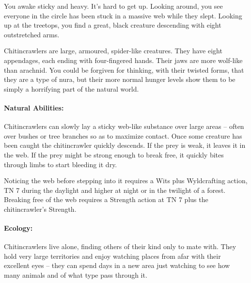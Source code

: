 \begin{multicols}{2}
\begin{itemize}
\end{itemize}


\label{chitincrawler}

\begin{boxtext}

You awake sticky and heavy.
It's hard to get up.
Looking around, you see everyone in the circle has been stuck in a massive web while they slept.
Looking up at the treetops, you find a great, black creature descending with eight outstretched arms.

\end{boxtext}

Chitincrawlers are large, armoured, spider-like creatures.
They have eight appendages, each ending with four-fingered hands.
Their jaws are more wolf-like than arachnid.
You could be forgiven for thinking, with their twisted forms, that they are a type of nura, but their more normal hunger levels show them to be simply a horrifying part of the natural world.

\chitincrawler

\paragraph{Natural Abilities:} Chitincrawlers can slowly lay a sticky web-like substance over large areas -- often over bushes or tree branches so as to maximize contact.
Once some creature has been caught the chitincrawler quickly descends.
If the prey is weak, it leaves it in the web.
If the prey might be strong enough to break free, it quickly bites through limbs to start bleeding it dry.

Noticing the web before stepping into it requires a Wits plus Wyldcrafting action, TN 7 during the daylight and higher at night or in the twilight of a forest.
Breaking free of the web requires a Strength action at TN 7 plus the chitincrawler's Strength.

\paragraph{Ecology:} Chitincrawlers live alone, finding others of their kind only to mate with.
They hold very large territories and enjoy watching places from afar with their excellent eyes -- they can spend days in a new area just watching to see how many animals and of what type pass through it.


\end{multicols}
